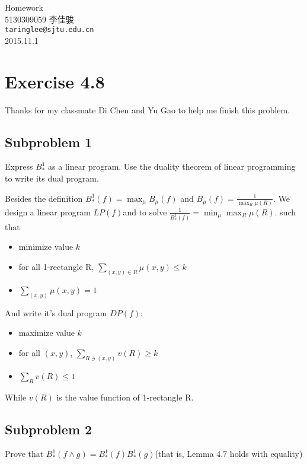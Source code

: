 \documentclass[11pt, fleqn, a4paper]{report}
\begin{document}
\begin{titlepage}
\vspace*{40mm}
\begin{center}
{\Huge Homework }\\[30mm]

{\Large 5130309059 \quad \quad 李佳骏}\\[3mm]
\texttt{taringlee@sjtu.edu.cn}\\[10mm]

2015.11.1

\end{center}
\end{titlepage}

\section*{Exercise 4.8}
Thanks for my classmate Di Chen and Yu Gao to help me finish this problem.
\subsection*{Subproblem 1}
Express $B_{*}^{1}$ as a linear program. Use the duality theorem of linear programming to write its dual program.

Besides the definition $B_{*}^{1}(f) = \max_{\mu}{B_{\mu}(f)}$ and $ B_{\mu}(f) = \frac{1}{\max_R{\mu(R)}}$. We design a linear program $LP(f)$and to solve $\frac{1}{B_{*}^{1}(f)} = \min_{\mu}{\max_{R}{\mu(R)}}$. such that
\begin{itemize}
\item minimize value $k$
\item for all 1-rectangle R, $\sum_{(x,y)\in R}{\mu(x, y)} \leq k$
\item $\sum_{(x,y)}{\mu(x,y)} = 1$
\end{itemize}
And write it's dual program $DP(f)$:
\begin{itemize}
\item maximize value $k$
\item for all $(x, y)$, $\sum_{R \ni (x, y)}{v(R)} \geq k$
\item $\sum_{R}{v(R)} \leq 1$
\end{itemize}
While $v(R)$ is the value function of 1-rectangle R.

\subsection*{Subproblem 2}
Prove that $B_{*}^{1}(f \land g) = B_{*}^{1}(f)B_{*}^{1}(g)$(that is, Lemma 4.7 holds with equality)
\end{document}
